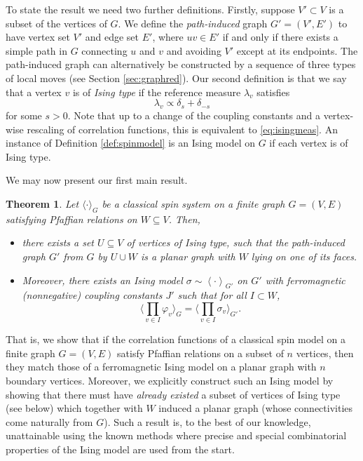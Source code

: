 \documentclass{article}
\newtheorem{theorem}{Theorem}
\numberwithin{equation}{section}
\theoremstyle{definition}
\theoremstyle{definition}
\theoremstyle{remark}
\newcommand\vp{\varphi}
\renewcommand{\l}{\lambda}
\begin{document}
To state the result we need two further definitions. Firstly, suppose $V' \subset V$ is a  subset of the vertices of $G$. We define the \emph{path-induced} graph $G'=(V',E')$ to have vertex set $V'$ and edge set $E'$, where $uv \in E'$ if and only if there exists a simple path in $G$ connecting $u$ and $v$ and avoiding $V'$ except at its endpoints. 
The path-induced graph can alternatively be constructed by a sequence of three types of local moves (see Section \ref{sec:graphred}). 
Our second definition is that we say that a vertex $v$ is of \emph{Ising type} if the reference measure $\l_v $ satisfies
\[
	\l_v \propto \delta_s + \delta_{-s}
\] 
for some $s > 0$. 
Note that up to a change of the coupling constants and a vertex-wise rescaling of correlation functions, this is equivalent to \eqref{eq:isingmeas}. 
An instance of Definition \ref{def:spinmodel} is an Ising model on $G$ if each vertex is of Ising type.

We may now present our first main result.
\begin{theorem} \label{thm:pfaffian}
	Let $\langle \cdot \rangle_G$ be a classical spin system on a finite graph $G=(V,E)$ 
    satisfying Pfaffian relations on $W\subseteq V$. 
    Then, 
	\begin{itemize}
		\item 
    there exists a set $U \subseteq V$ of vertices of Ising type, 
    such that the path-induced graph $G'$ from $G$ by $U\cup W$ is a planar graph with $W$ lying on one of its faces.
    		\item 
			Moreover, there exists an Ising model $\sigma \sim \left< \cdot  \right>_{G'}$ on $G'$ with ferromagnetic (nonnegative) coupling constants $J'$ such that 
    for all $I \subset W$,
    \[
        {\Big \langle \prod_{v \in I} {\vp_{v} } \Big\rangle_G}
	= \Big \langle \prod_{v\in I} \sigma_{v}\Big \rangle_{G'} .
    \]
	\end{itemize}
\end{theorem}
That is, we show that if the correlation functions of a classical spin model on a finite graph $G = (V, E)$
satisfy Pfaffian relations on a subset of $n$ vertices, then they match those of a ferromagnetic Ising model on a planar graph with $n$ boundary vertices.
Moreover, we explicitly construct such an Ising model by showing that there must have \emph{already existed} a subset of vertices of Ising type (see below) which together with $W$ induced a planar graph (whose connectivities come naturally from $G$). 
Such a result is, to the best of our knowledge, unattainable using the known methods where precise and special combinatorial properties of the Ising model are used from the start.
\end{document}
